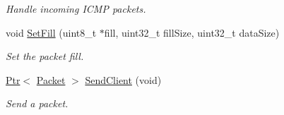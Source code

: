 \begin{DoxyCompactItemize}
\begin{DoxyCompactList}\small\item\em Handle incoming I\+C\+MP packets. \end{DoxyCompactList}\item 
void \hyperlink{classIpv6FragmentationTest_a6143375e886a978a720812a578767ab3}{Set\+Fill} (uint8\+\_\+t $\ast$fill, uint32\+\_\+t fill\+Size, uint32\+\_\+t data\+Size)
\begin{DoxyCompactList}\small\item\em Set the packet fill. \end{DoxyCompactList}\item 
\hyperlink{classns3_1_1Ptr}{Ptr}$<$ \hyperlink{classns3_1_1Packet}{Packet} $>$ \hyperlink{classIpv6FragmentationTest_ac687632e8c098b596c007d201f1d5f3c}{Send\+Client} (void)
\begin{DoxyCompactList}\small\item\em Send a packet. \end{DoxyCompactList}\end{DoxyCompactItemize}

